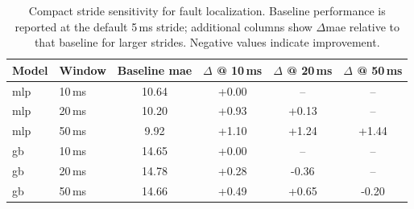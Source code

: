 \begin{table}[pos=ht]
\caption{Compact stride sensitivity for fault localization. Baseline performance is reported at the default 5\,ms stride; additional columns show $\Delta$\ac{mae} relative to that baseline for larger strides. Negative values indicate improvement.}
\small
\label{tab:fl_stride_sensitivity}
\centering
\begin{tabular}{llcccc}
\toprule
\textbf{Model} & \textbf{Window} & \textbf{Baseline \acs{mae}} & \textbf{$\Delta$ @ 10\,ms} & \textbf{$\Delta$ @ 20\,ms} & \textbf{$\Delta$ @ 50\,ms} \\
\midrule
\ac{mlp} & 10\,ms & 10.64 & +0.00 & -- & -- \\
\ac{mlp} & 20\,ms & 10.20 & +0.93 & +0.13 & -- \\
\ac{mlp} & 50\,ms & 9.92 & +1.10 & +1.24 & +1.44 \\
\midrule
\ac{gb} & 10\,ms & 14.65 & +0.00 & -- & -- \\
\ac{gb} & 20\,ms & 14.78 & +0.28 & -0.36 & -- \\
\ac{gb} & 50\,ms & 14.66 & +0.49 & +0.65 & -0.20 \\
\bottomrule
\end{tabular}
\end{table}
